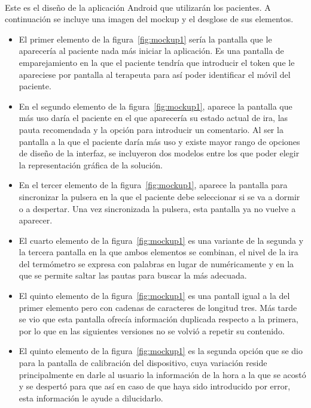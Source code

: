 \paragraph{}
Este es el diseño de la aplicación Android que utilizarán los pacientes. A continuación se incluye una imagen del mockup y el desglose de sus elementos.
\begin{itemize}
    \item El primer elemento de la figura~\ref{fig:mockup1} sería la pantalla que le aparecería al paciente nada más iniciar la aplicación. Es una pantalla de emparejamiento en la que el paciente tendría que introducir el token que le apareciese por pantalla al terapeuta para así poder identificar el móvil del paciente.
    
    \item En el segundo elemento de la figura~\ref{fig:mockup1}, aparece la pantalla que más uso daría el paciente en el que aparecería su estado actual de ira, las pauta recomendada y la opción para introducir un comentario. Al ser la pantalla a la que el paciente daría más uso y existe mayor rango de opciones de diseño de la interfaz, se incluyeron dos modelos entre los que poder elegir la representación gráfica de la solución.
    \item En el tercer elemento de la figura~\ref{fig:mockup1}, aparece la pantalla para sincronizar la pulsera en la que el paciente debe seleccionar si se va a dormir o a despertar. Una vez sincronizada la pulsera, esta pantalla ya no vuelve a aparecer.
    \item El cuarto elemento de la figura~\ref{fig:mockup1} es una variante de la segunda y la tercera pantalla en la que ambos elementos se combinan, el nivel de la ira del termómetro se expresa con palabras en lugar de numéricamente y en la que se permite saltar las pautas para buscar la más adecuada.
    \item El quinto elemento de la figura~\ref{fig:mockup1} es una pantall igual a la del primer elemento pero con cadenas de caracteres de longitud tres. Más tarde se vio que esta pantalla ofrecía información duplicada respecto a la primera, por lo que en las siguientes versiones no se volvió a repetir su contenido.
    \item El quinto elemento de la figura~\ref{fig:mockup1} es la segunda opción que se dio para la pantalla de calibración del dispositivo, cuya variación reside principalmente en darle al usuario la información de la hora a la que se acostó y se despertó para que así en caso de que haya sido introducido por error, esta información le ayude a dilucidarlo.
\end{itemize}

